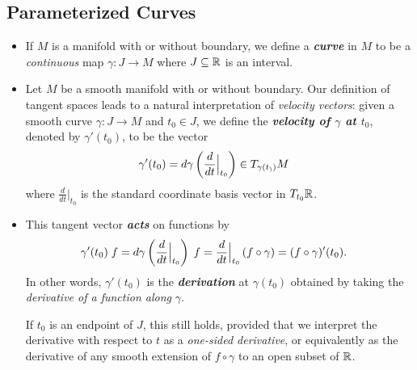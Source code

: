 \documentclass[11pt]{article}
\begin{document}
\subsection{Parameterized Curves}
\begin{itemize}
\item \begin{definition}
If $M$ is a manifold with or without boundary, we define a \textbf{\emph{curve}} in $M$ to be a \emph{continuous} map $\gamma: J \rightarrow M$ where $J \subseteq {\mathbb R}$ is an interval. 
\end{definition}

\item \begin{definition}
Let $M$ be a smooth manifold with or without boundary. Our definition of tangent spaces leads to a natural interpretation of \emph{velocity vectors}: given a smooth curve $\gamma: J \rightarrow M$ and $t_{0} \in J$, we define the \textbf{\emph{velocity of $\gamma$ at $t_0$}}, denoted by $\gamma'(t_0)$, to be the vector
\begin{align*}
\gamma'(t_0) &= d\gamma\left(\frac{d}{dt}\Bigr|_{t_0}\right) \in T_{\gamma(t_))}M
\end{align*} where $\frac{d}{dt}\big|_{t_0}$ is the standard coordinate basis vector in $T_{t_0}{\mathbb R}$. 
\end{definition}

\item \begin{remark}
This tangent vector \emph{\textbf{acts}} on functions by
\begin{align*}
\gamma'(t_0)\;f &= d\gamma\left(\frac{d}{dt}\Bigr|_{t_0}\right)\;f = \frac{d}{dt}\Bigr|_{t_0}\left(f \circ \gamma\right) = (f \circ \gamma)'(t_0).
\end{align*}
In other words, $\gamma'(t_0)$ is the \emph{\textbf{derivation}} at $\gamma(t_0)$ obtained by taking the \emph{derivative of a function along} $\gamma$. 

If $t_0$ is an endpoint of $J$, this still holds, provided that we interpret the derivative with respect to $t$ as a \emph{one-sided derivative},  or equivalently as the derivative of any smooth extension of $f \circ \gamma$ to an open subset of ${\mathbb R}$.
\end{remark}


\end{itemize}
\end{document}
